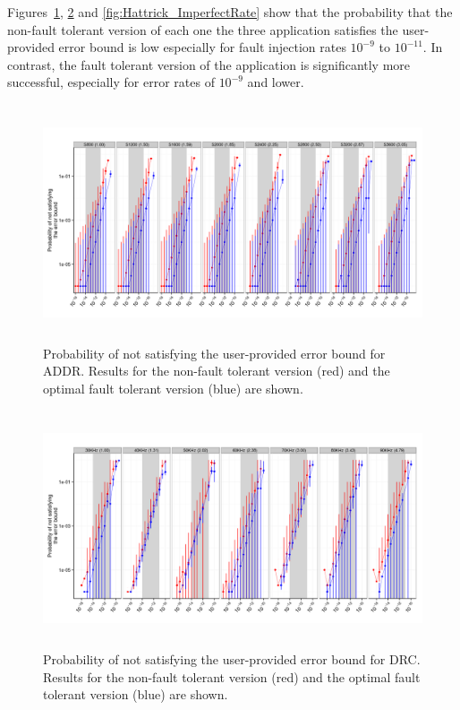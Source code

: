 \documentclass{sig-alternate}
\begin{document}
Figures~\ref{fig:Lasso_ImperfectRate}, \ref{fig:DRC_ImperfectRate} and \ref{fig:Hattrick_ImperfectRate} show that the probability that the non-fault tolerant version of each one the three application satisfies the user-provided error bound is low especially for fault injection rates $10^{-9}$ to $10^{-11}$.
In contrast, the fault tolerant version of the application is significantly more successful, especially for error rates of $10^{-9}$ and lower.


\begin{figure}[ht!]
\centering
\includegraphics[height=2.75in]{figs/Lasso_ImperfectRate_log.png}
\caption{Probability of not satisfying the user-provided error bound for ADDR. Results for the non-fault tolerant version (red) and the optimal fault tolerant version (blue) are shown.}
\label{fig:Lasso_ImperfectRate}
\end{figure}

\begin{figure}[ht!]
\centering
\includegraphics[height=2.75in]{figs/DRC_ImperfectRate_log.png}
\caption{Probability of not satisfying the user-provided error bound for DRC. Results for the non-fault tolerant version (red) and the optimal fault tolerant version (blue) are shown.}
\label{fig:DRC_ImperfectRate}
\end{figure}
\end{document}
